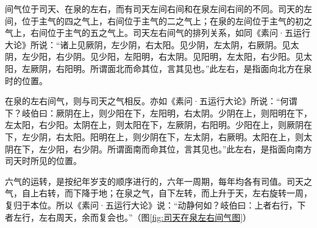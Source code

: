 \documentclass[12pt]{ctexbook}
\begin{document}
间气位于司天、在泉的左右，而有司天左间右间和在泉左间右间的不同。司天的左间，位于主气的四之气上，右间位于主气的二之气上；在泉的左间位于主气的初之气上，右间位于主气的五之气上。司天左右间气的排列关系，如同《素问·五运行大论》所说：“诸上见厥阴，左少阴，右太阳。见少阴，左太阴，右厥阴。见太阴，左少阳，右少阴。见少阳，左阳明，右太阴。见阳明，左太阳，右少阳。见太阳，左厥阴，右阳明。所谓面北而命其位，言其见也。”此左右，是指面向北方在泉时的位置。

在泉的左右间气，则与司天之气相反。亦如《素问·五运行大论》所说：“何谓下？岐伯曰：厥阴在上，则少阳在下，左阳明，右太阴。少阴在上，则阳明在下，左太阳，右少阳。太阴在上，则太阳在下，左厥阴，右阳明。少阳在上，则厥阴在下，左少阴，右太阳。阳明在上，则少阴在下，左太阴，右厥明。太阳在上，则太阴在下，左少阳，右少阴。所谓面南而命其位，言其见也。”此左右，是指面向南方司天时所见的位置。

六气的运转，是按纪年岁支的顺序进行的，六年一周期，每年均各有司值。司天之气，自上右转，而下降于地；在泉之气，自下左转，而上升于天，左右旋转一周，复归于本位。所以《素问·五运行大论》说：“动静何如？岐伯曰：上者右行，下者左行，左右周天，余而复会也。”（图\ref{fig:司天在泉左右间气图}）

\end{document}
